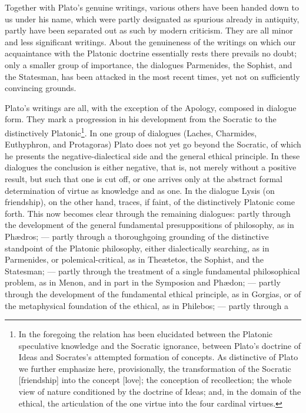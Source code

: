 Together with Plato's genuine writings, various others have been handed
down to us under his name, which were partly designated as spurious already
in antiquity, partly have been separated out as such by modern criticism.
They are all minor and less significant writings. About the genuineness of
the writings on which our acquaintance with the Platonic doctrine
essentially rests there prevails no doubt; only a smaller group of
importance, the dialogues Parmenides, the Sophist, and the Statesman, has
been attacked in the most recent times, yet not on sufficiently convincing
grounds.

Plato's writings are all, with the exception of the Apology, composed in
dialogue form. They mark a progression in his development from the Socratic
to the distinctively Platonic\footnote{In the foregoing the relation has been
elucidated between the Platonic speculative knowledge and the Socratic
ignorance, between Plato's doctrine of Ideas and Socrates's attempted
formation of concepts. As distinctive of Plato we further emphasize here,
provisionally, the transformation of the Socratic  [friendship]
into the concept  [love]; the conception of recollection; the whole
view of nature conditioned by the doctrine of Ideas; and, in the domain of
the ethical, the articulation of the one virtue into the four cardinal
virtues.}. In one group of dialogues (Laches, Charmides, Euthyphron, and
Protagoras) Plato does not yet go beyond the Socratic, of which he presents
the negative-dialectical side and the general ethical principle. In these
dialogues the conclusion is either negative, that is, not merely without a
positive result, but such that one is cut off, or one arrives only at the
abstract formal determination of virtue as knowledge and as one.
In the dialogue Lysis (on friendship), on the other hand, traces, if faint,
of the distinctively Platonic come forth. This now becomes clear through the
remaining dialogues: partly through the development of the general
fundamental presuppositions of philosophy, as in Phædros; --- partly through
a thoroughgoing grounding of the distinctive standpoint of the Platonic
philosophy, either dialectically searching, as in Parmenides, or
polemical-critical, as in Theætetos, the Sophist, and the Statesman; ---
partly through the treatment of a single fundamental philosophical problem,
as in Menon, and in part in the Symposion and Phædon; --- partly through the
development of the fundamental ethical principle, as in Gorgias, or of the
metaphysical foundation of the ethical, as in Philebos; --- partly through a
